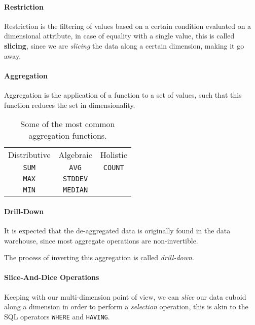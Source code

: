 \documentclass[openright, twoside, twocolumn, a4paper, 10pt]{report}
\begin{document}
\paragraph{Restriction}

Restriction is the filtering of values based on a certain condition evaluated
on a dimensional attribute, in case of equality with a single value, this is called
\textbf{slicing}, since we are \emph{slicing} the data along a certain dimension, making
it go away.

\paragraph{Aggregation}

Aggregation is the application of a function to a set of values, such that this
function reduces the set in dimensionality.

\begin{table}[h!]
	\centering
	\begin{tabular}{c c c}
		\rowcolor{gray!50}
		Distributive & Algebraic       & Holistic       \\
		\texttt{SUM} & \texttt{AVG}    & \texttt{COUNT} \\
		\texttt{MAX} & \texttt{STDDEV} &                \\
		\texttt{MIN} & \texttt{MEDIAN} &                \\
	\end{tabular}
	\caption{Some of the most common aggregation functions.}\label{tab:aggregate}
\end{table}

\paragraph{Drill-Down}
It is expected that the de-aggregated data is originally found in the data warehouse,
since most aggregate operations are non-invertible.

The process of inverting this aggregation is called \emph{drill-down}.

\paragraph{Slice-And-Dice Operations}

Keeping with our multi-dimension point of view, we can \emph{slice} our data cuboid
along a dimension in order to perform a \emph{selection} operation, this
is akin to the SQL operators \texttt{WHERE} and \texttt{HAVING}.
\end{document}
